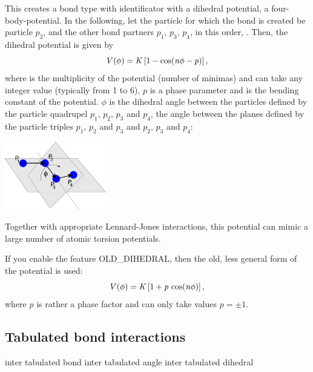 This creates a bond type with identificator 
with a dihedral potential, \ie a four-body-potential. In the following,
let the particle for which the bond is created be particle $p_2$, and
the other bond partners $p_1$, $p_3$, $p_4$, in this order, \ie
{}. Then, the
dihedral potential is given by
\begin{equation}
  V(\phi) = \mathrm{\mathit{K}}\left[1 - \cos(\mathrm{\mathit{n}}\phi - \mathrm{\mathit{p}})\right],
\end{equation}
where  is the multiplicity of the potential (number of minimas)
and can take any integer value (typically from 1 to 6), $p$ is a phase
parameter and  is the bending constant of the potential. $\phi$
is the dihedral angle between the particles defined by the particle
quadrupel $p_1$, $p_2$, $p_3$ and $p_4$, \ie the angle between the
planes defined by the particle triples $p_1$, $p_2$ and $p_3$ and
$p_2$, $p_3$ and $p_4$:
\begin{center}
  \includegraphics[height=8em]{figures/dihedral-angle}
\end{center}
Together with appropriate Lennard-Jones interactions, this potential
can mimic a large number of atomic torsion potentials.

If you enable the feature OLD_DIHEDRAL, then the old, less
general form of the potential is used:
\begin{equation}
  V(\phi) = \mathrm{\mathit{K}}\left[1 + \mathrm{\mathit{p}}\,\cos(\mathrm{\mathit{n}}\phi)\right],
\end{equation}
where $p$ is rather a phase factor and can only take values $p=\pm 1$.

\subsection{Tabulated bond interactions}

\begin{essyntax}
     inter 
    tabulated bond 
     inter 
    tabulated angle 
     inter 
    tabulated dihedral 
\end{essyntax}

